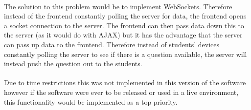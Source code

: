 \documentclass[10pt]{report}
\begin{document}
    \paragraph{}
    The solution to this problem would be to implement WebSockets.  Therefore instead of the frontend
    constantly polling the server for data, the frontend opens a socket connection to the server.  The
    frontend can then pass data down this to the server (as it would do with AJAX) but it has the
    advantage that the server can pass up data to the frontend.  Therefore instead of students' devices 
    constantly polling the server to see if there is a question available, the server will instead push
    the question out to the students.
    
    \paragraph{}
    Due to time restrictions this was not implemented in this version of the software however if the
    software were ever to be released or used in a live environment, this functionality would be
    implemented as a top priority.
\end{document}
